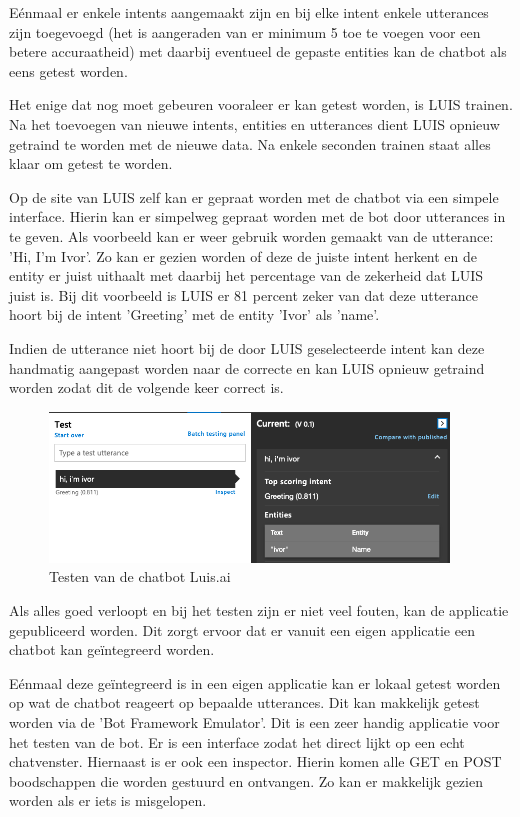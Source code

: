 Eénmaal er enkele intents aangemaakt zijn en bij elke intent enkele utterances zijn toegevoegd (het is aangeraden van er minimum 5 toe te voegen voor een betere accuraatheid) met daarbij eventueel de gepaste entities kan de chatbot als eens getest worden.

Het enige dat nog moet gebeuren vooraleer er kan getest worden, is LUIS trainen. Na het toevoegen van nieuwe intents, entities en utterances dient LUIS opnieuw getraind te worden met de nieuwe data. Na enkele seconden trainen staat alles klaar om getest te worden.

Op de site van LUIS zelf kan er gepraat worden met de chatbot via een simpele interface. Hierin kan er simpelweg gepraat worden met de bot door utterances in te geven. Als voorbeeld kan er weer gebruik worden gemaakt van de utterance: 'Hi, I'm Ivor'. Zo kan er gezien worden of deze de juiste intent herkent en de entity er juist uithaalt met daarbij het percentage van de zekerheid dat LUIS juist is. Bij dit voorbeeld is LUIS er 81 percent zeker van dat deze utterance hoort bij de intent 'Greeting' met de entity 'Ivor' als 'name'.

Indien de utterance niet hoort bij de door LUIS geselecteerde intent kan deze handmatig aangepast worden naar de correcte en kan LUIS opnieuw getraind worden zodat dit de volgende keer correct is.

\begin{figure}[h!]
	\centering
	\includegraphics[height=4cm]{img/test.png}
	\caption{Testen van de chatbot Luis.ai}
	\label{fig:test}
\end{figure}

Als alles goed verloopt en bij het testen zijn er niet veel fouten, kan de applicatie gepubliceerd worden. Dit zorgt ervoor dat er vanuit een eigen applicatie een chatbot kan geïntegreerd worden.

Eénmaal deze geïntegreerd is in een eigen applicatie kan er lokaal getest worden op wat de chatbot reageert op bepaalde utterances. Dit kan makkelijk getest worden via de 'Bot Framework Emulator'. Dit is een zeer handig applicatie voor het testen van de bot. Er is een interface zodat het direct lijkt op een echt chatvenster. Hiernaast is er ook een inspector. Hierin komen alle GET en POST boodschappen die worden gestuurd en ontvangen. Zo kan er makkelijk gezien worden als er iets is misgelopen.

